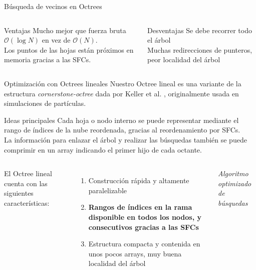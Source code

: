 \documentclass[aspectratio=169]{beamer}
\begin{document}
\begin{frame}{Búsqueda de vecinos en Octrees}
    \begin{columns}
        \begin{exampleblock}{Ventajas}
            \textrightarrow \: Mucho mejor que fuerza bruta $\mathcal{O}(\log{N})$ en vez de $\mathcal{O}(N)$. \\
            \textrightarrow \: Los puntos de las hojas están próximos en memoria gracias a las SFCs. \\
        \end{exampleblock}
        \begin{alertblock}{Desventajas}
            \textrightarrow \: Se debe recorrer todo el árbol \\
            \textrightarrow \: Muchas redirecciones de punteros, peor localidad del árbol \\
        \end{alertblock}
    \end{columns}

\end{frame}

\begin{frame}{Optimización con Octrees lineales}
        Nuestro Octree lineal es una variante de la estructura \textit{cornerstone-octree} dada por Keller et al. \cite{Keller2023}, originalmente usada en simulaciones de partículas.
        \vspace{1em}
        \begin{block}{Ideas principales}
            \textrightarrow \: Cada hoja o nodo interno se puede representar mediante el rango de índices de la nube reordenada, gracias al reordenamiento por SFCs. \\
            \textrightarrow \: La información para enlazar el árbol y realizar las búsquedas también se puede comprimir en un array indicando el primer hijo de cada octante.
        \end{block}    
\end{frame}

\begin{frame}
    \begin{columns}
        El Octree lineal cuenta con las siguientes características:
        \begin{enumerate}
            \item Construcción rápida y altamente paralelizable
            \item \textbf{Rangos de índices en la rama disponible en todos los nodos, y consecutivos gracias a las SFCs}
            \item Estructura compacta y contenida en unos pocos arrays, muy buena localidad del árbol
        \end{enumerate}
        \textit{Algoritmo optimizado de búsquedas}
    \end{columns}

\end{frame}
\end{document}
